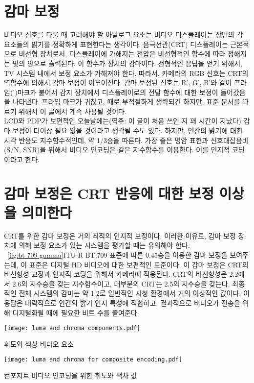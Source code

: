 \section{감마 보정}
비디오 신호를 다룰 때 고려해야 할 아날로그 요소는 비디오 디스플레이는 장면의 각 요소들의 밝기를 정확하게 표현한다는 생각이다.
음극선관(CRT) 디스플레이는 근본적으로 비선형 장치로서, 디스플레이에 가해지는 전압은 비선형적인 함수에 따라 정해지는 빛의 양으로 출력된다.
이 함수가 장치의 감마이다. 선형적인 응답을 얻기 위해서, TV 시스템 내에서 보정 요소가 가해져야 한다.
따라서, 카메라의 RGB 신호는 CRT의 역함수에 의해서 감마 보정이 이루어진다. 감마 보정된 신호는 R', G', B'와 같이 프라임(')마크가 붙어서 감지 장치에서 디스플레이로의 전달 함수에 대한 보정이 들어갔음을 나타낸다.
프라임 마크가 귀찮고, 때로 부적절하게 생략되긴 하지만, 표준 문서를 따르기 위해서 이 글에서 계속 사용될 것이다.
\\
LCD와 PDP가 보편적인 오늘날에는(역주: 이 글이 처음 쓰인 지 꽤 시간이 지났다) 감마 보정이 더이상 필요 없을 것이라고 생각될 수도 있다.
하지만, 인간의 밝기에 대한 시각 반응도 지수함수적인데, 약 1/3승을 따른다. 가장 좋은 명암 표현과 신호대잡음비(S/N, SNR)을 위해서 비디오 인코딩은 같은 지수함수를 이용한다. 이를 인지적 코딩이라고 한다.

\section{감마 보정은 CRT 반응에 대한 보정 이상을 의미한다}
CRT를 위한 감마 보정은 거의 최적의 인지적 보정이다. 이러한 이유로, 감마 보정 장치에 의해 보정 요소가 있는 시스템을 평가할 때는 유의해야 한다.
\\
\figurename~\ref{fig:bt 709 gamma}\는 ITU-R BT.709 표준에 따른 0.45승을 이용한 감마 보정을 보여주는데, 이 표준은 디지털 HD 비디오에 대한 보편적인 표준이다.
이 감마 보정은 CRT의 비선형성 교정과 인지적 코딩을 위해서 카메라에 적용된다. CRT의 비선형성은 2.2에서 2.6의 지수승을 갖는 지수함수이고, 대부분의 CRT는 2.5의 지수승을 갖는다.
최종적인 전체 시스템의 감마는 약 1.2로 일반적인 시청 환경에서 거의 이상적인 값이다. 이 응답은 대략적으로 인간의 밝기 인지 특성에 적합하고, 결과적으로 비디오가 전송을 위해 디지털화될 때에 필요한 비트 수를 줄여준다.

\begin{tab*}[h!]
    \centering
    \texttt{[image: luma and chroma components.pdf]}
    \caption{휘도와 색상 비디오 요소}\label{table:luma and chroma components}
\end{tab*}
\begin{tab}[h!]
    \centering
    \texttt{[image: luma and chroma for composite encoding.pdf]}
    \caption{컴포지트 비디오 인코딩을 위한 휘도와 색차 값}\label{table:luma and chroma for composite encoding}
\end{tab}
